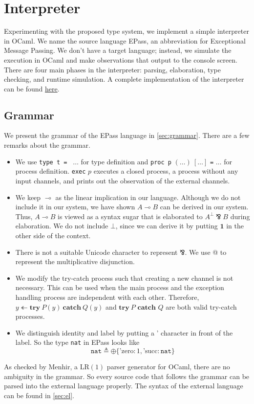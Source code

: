 \documentclass[12pt, openany]{memoir}
\newcommand*{\pare}[0]{\mathbin{\bindnasrepma}}
\newcommand*{\trycatch}[3]{#3 \twoheadleftarrow	\textbf{try}\ #1(#3)\ \textbf{catch}\ #2(#3)}
\begin{document}
\chapter{Interpreter}
Experimenting with the proposed type system, we implement a simple interpreter in OCaml. 
We name the source language EPass, an abbreviation for Exceptional Message Passing. 
We don't have a target language; instead, we simulate the execution in OCaml and make observations that output to the console screen. 
There are four main phases in the interpreter: parsing, elaboration, type checking, and runtime simulation.
A complete implementation of the interpreter can be found \href{https://github.com/cekington/ePass}{here}.
\section{Grammar} 
We present the grammar of the EPass language in \cref{sec:grammar}. There are a few remarks about the grammar.
\begin{itemize}
  \item We use \texttt{type t = } $\ldots$ for type definition and \texttt{proc p} $(\ldots)\ [\ldots]$ \texttt{=} $\ldots$ for process definition.
  \texttt{exec} $p$ executes a closed process, a process without any input channels, and prints out the observation of the external channels. 
  \item We keep $\multimap$ as the linear implication in our language. Although we do not include it in our system, we have shown $A \multimap B$ can be derived in our system.
  Thus, $A \multimap B$ is viewed as a syntax sugar that is elaborated to $A^\bot \pare B$ during elaboration.
  We do not include $\boldsymbol{\bot}$, since we can derive it by putting $\textbf{1}$ in the other side of the context.
  \item There is not a suitable Unicode character to represent $\pare$. We use @ to represent the multiplicative disjunction.
  \item We modify the try-catch process such that creating a new channel is not necessary. 
  This can be used when the main process and the exception handling process are independent with each other.
  Therefore, $\trycatch{P}{Q}{y}$ and $\textbf{try}\ P \textbf{ catch } Q$ are both valid try-catch processes.
  \item We distinguish identity and label by putting a ' character in front of the label. So the type \texttt{nat} in EPass looks like
  \[
    \texttt{nat} \triangleq \oplus\{\text{'zero} : 1 , \text{'succ} : \texttt{nat}\}
  \]
\end{itemize}
As checked by Menhir, a LR$(1)$ parser generator for OCaml, there are no ambiguity in the grammar.
So every source code that follows the grammar can be parsed into the external language properly.
The syntax of the external language can be found in \cref{sec:el}.
\end{document}
